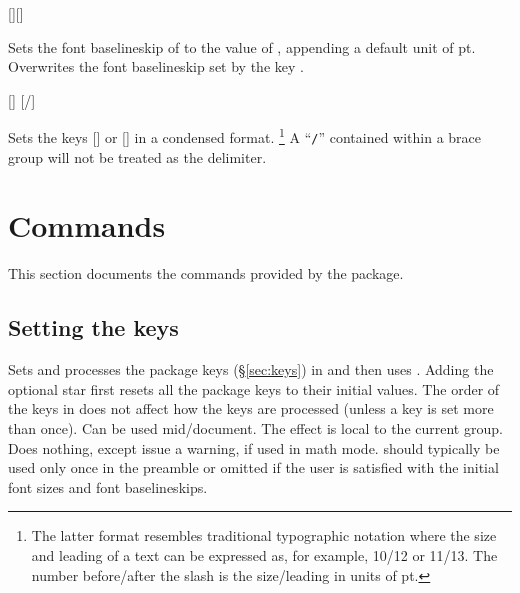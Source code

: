\documentclass{beery}
\begin{document}
\begin{mydisplaycode}
  [][]
\end{mydisplaycode}

Sets the font baselineskip of  to the value of , appending a default unit of \unit{pt}.
Overwrites the font baselineskip set by the key .

\begin{mydisplaycode}
  []
  \nopagebreak\newline
  [/]
\end{mydisplaycode}

Sets the keys [] or [] in a condensed format.%
\footnote
  {%
    The latter format resembles traditional typographic notation where the size and leading of a text can be expressed as, for example, \num{10}/\num{12} or \num{11}/\num{13}.
    The number before\slash{}after the slash is the size\slash{}leading in units of \unit{pt}.%
  }
A \enquote{\texttt{/}} contained within a brace group will not be treated as the delimiter.


\section{Commands}
\label{sec:commands}

This section documents the commands provided by the  package.

\subsection{Setting the keys}
\label{subsec:fontscalesetup}

\begin{mydisplaycode}
   \sarg{} 
\end{mydisplaycode}

Sets and processes the  package keys (\S\ref{sec:keys}) in  and then uses .
Adding the optional star first resets all the  package keys to their initial values.
The order of the keys in  does not affect how the keys are processed (unless a key is set more than once).
Can be used mid\-/document.
The effect is local to the current group.
Does nothing, except issue a warning, if used in math mode.
 should typically be used only once in the preamble or omitted if the user is satisfied with the initial font sizes and font baselineskips.
\end{document}
